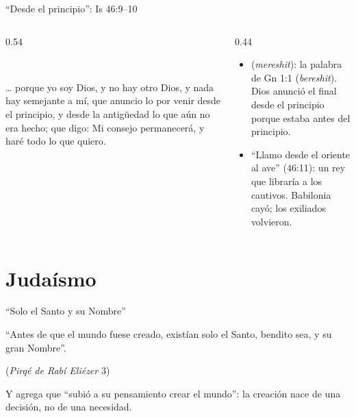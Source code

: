 \begin{frame}{``Desde el principio'': Is 46:9--10}
\begin{columns}[t,onlytextwidth]
\begin{column}{0.54\textwidth}
\begin{center}\\[1pt]\end{center}
\begin{cita}\ldots{} porque yo soy Dios, y no hay otro Dios, y nada hay semejante a mí, que anuncio lo por venir desde el principio, y desde la antigüedad lo que aún no era hecho; que digo: Mi consejo permanecerá, y haré todo lo que quiero.\end{cita}
\end{column}
\begin{column}{0.44\textwidth}\scriptsize
\begin{itemize}
\item {} (\emph{mereshit}): la palabra de Gn 1:1 (\emph{bereshit}). Dios anunció el final desde el principio porque estaba antes del principio.
\item ``Llamo desde el oriente al ave'' (46:11): un rey que libraría a los cautivos. Babilonia cayó; los exiliados volvieron.
\end{itemize}
\end{column}
\end{columns}
\end{frame}

\section{Judaísmo}

\begin{frame}{``Solo el Santo y su Nombre''}
\begin{center}\end{center}
\begin{tcolorbox}[colback=papiro,colframe=dorado,boxrule=1pt,arc=3pt]
\centering\small ``Antes de que el mundo fuese creado, existían solo el Santo, bendito sea, y su gran Nombre''.\par{\scriptsize\color{gris}(\emph{Pirqé de Rabí Eliézer} 3)}
\end{tcolorbox}
\small Y agrega que ``subió a su pensamiento crear el mundo'': la creación nace de una decisión, no de una necesidad.\par\medskip
{}
\end{frame}

